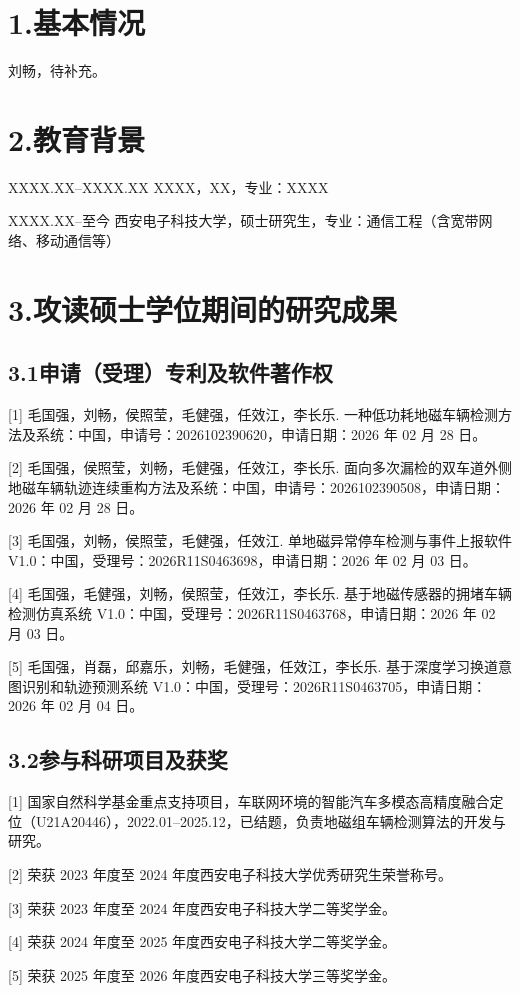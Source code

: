 
\section*{1.\quad 基本情况}

刘畅，待补充。

\section*{2.\quad 教育背景}

\noindent
XXXX.XX--XXXX.XX \quad XXXX，XX，专业：XXXX

\noindent
XXXX.XX--至今 \quad 西安电子科技大学，硕士研究生，专业：通信工程（含宽带网络、移动通信等）

\section*{3.\quad 攻读硕士学位期间的研究成果}

\subsection*{3.1\quad 申请（受理）专利及软件著作权}

[1] 毛国强，刘畅，侯照莹，毛健强，任效江，李长乐. 一种低功耗地磁车辆检测方法及系统：中国，申请号：2026102390620，申请日期：2026 年 02 月 28 日。

[2] 毛国强，侯照莹，刘畅，毛健强，任效江，李长乐. 面向多次漏检的双车道外侧地磁车辆轨迹连续重构方法及系统：中国，申请号：2026102390508，申请日期：2026 年 02 月 28 日。

[3] 毛国强，刘畅，侯照莹，毛健强，任效江. 单地磁异常停车检测与事件上报软件 V1.0：中国，受理号：2026R11S0463698，申请日期：2026 年 02 月 03 日。

[4] 毛国强，毛健强，刘畅，侯照莹，任效江，李长乐. 基于地磁传感器的拥堵车辆检测仿真系统 V1.0：中国，受理号：2026R11S0463768，申请日期：2026 年 02 月 03 日。

[5] 毛国强，肖磊，邱嘉乐，刘畅，毛健强，任效江，李长乐. 基于深度学习换道意图识别和轨迹预测系统 V1.0：中国，受理号：2026R11S0463705，申请日期：2026 年 02 月 04 日。

\subsection*{3.2\quad 参与科研项目及获奖}

[1] 国家自然科学基金重点支持项目，车联网环境的智能汽车多模态高精度融合定位（U21A20446），2022.01--2025.12，已结题，负责地磁组车辆检测算法的开发与研究。

[2] 荣获 2023 年度至 2024 年度西安电子科技大学优秀研究生荣誉称号。

[3] 荣获 2023 年度至 2024 年度西安电子科技大学二等奖学金。

[4] 荣获 2024 年度至 2025 年度西安电子科技大学二等奖学金。

[5] 荣获 2025 年度至 2026 年度西安电子科技大学三等奖学金。


